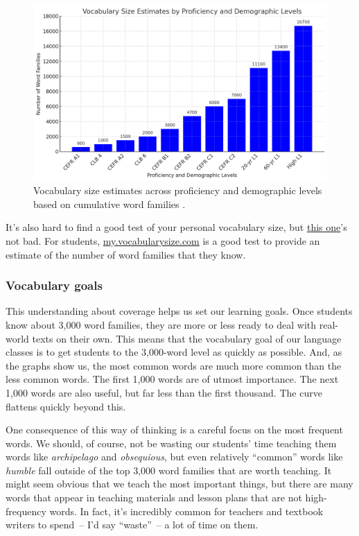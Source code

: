 \begin{figure}
    \centering
    \includegraphics[width=0.8\linewidth]{figures/vocab-size-est.png}
    \caption{Vocabulary size estimates across proficiency and demographic levels based on cumulative word families \citep{brysbaert2016, capel2010, capel2012}.}
    \label{fig:voc-size-est}
\end{figure}


It's also hard to find a good test of your personal vocabulary size, but \href{https://www.vocabularytester.com/vocabulary-test}{this one}'s not bad. For students, \href{https://my.vocabularysize.com/}{my.vocabularysize.com} is a good test to provide an estimate of the number of word families that they know.

\subsubsection*{Vocabulary goals}

This understanding about coverage helps us set our learning goals. Once students know about 3,000 word families, they are more or less ready to deal with real-world texts on their own. This means that the vocabulary goal of our language classes is to get students to the 3,000-word level as quickly as possible. And, as the graphs show us, the most common words are much more common than the less common words. The first 1,000 words are of utmost importance. The next 1,000 words are also useful, but far less than the first thousand. The curve flattens quickly beyond this.

One consequence of this way of thinking is a careful focus on the most frequent words. We should, of course, not be wasting our students' time teaching them words like \textit{archipelago} and \textit{obsequious}, but even relatively ``common'' words like \textit{humble} fall outside of the top 3,000 word families that are worth teaching. It might seem obvious that we teach the most important things, but there are many words that appear in teaching materials and lesson plans that are not high-frequency words. In fact, it's incredibly common for teachers and textbook writers to spend~-- I'd say ``waste''~-- a lot of time on them.

